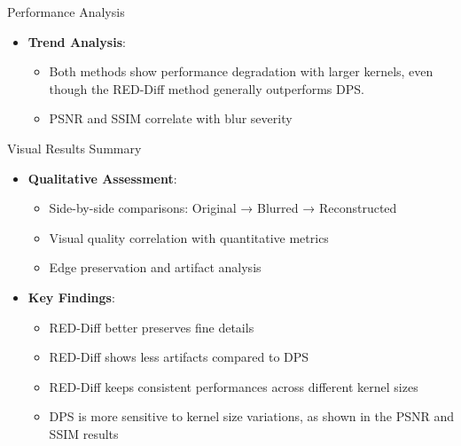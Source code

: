\begin{frame}{Performance Analysis}
    \begin{itemize}
        \item \textbf{Trend Analysis}:
              \begin{itemize}
                  \item Both methods show performance degradation with larger kernels, even though the RED-Diff method generally outperforms DPS.
                  \item PSNR and SSIM correlate with blur severity
              \end{itemize}
    \end{itemize}
\end{frame}

\begin{frame}{Visual Results Summary}
    \begin{itemize}
        \item \textbf{Qualitative Assessment}:
              \begin{itemize}
                  \item Side-by-side comparisons: Original → Blurred → Reconstructed
                  \item Visual quality correlation with quantitative metrics
                  \item Edge preservation and artifact analysis
              \end{itemize}
        \item \textbf{Key Findings}:
              \begin{itemize}
                  \item RED-Diff better preserves fine details
                  \item RED-Diff shows less artifacts compared to DPS
                  \item RED-Diff keeps consistent performances across different kernel sizes
                  \item DPS is more sensitive to kernel size variations, as shown in the PSNR and SSIM results
              \end{itemize}
    \end{itemize}
\end{frame}